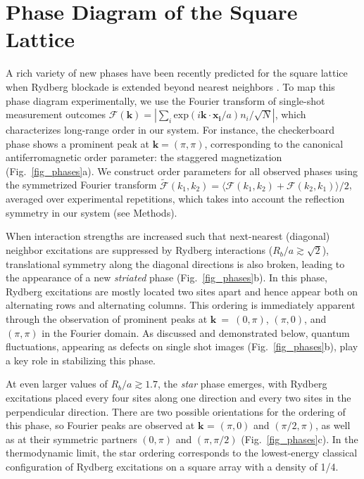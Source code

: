 \documentclass[reprint,twocolumn,secnumarabic,amssymb, aps, prl]{revtex4-1}
\begin{document}
\section{Phase Diagram of the Square Lattice}

A rich variety of new phases have been recently predicted for the square lattice when Rydberg blockade is extended beyond nearest neighbors \cite{Rhine2020}. To map this phase diagram experimentally, we use the Fourier transform of single-shot measurement outcomes $\mathcal{F}(\mathbf{k}) =  \left|\sum_{i} \text{exp} (i \mathbf{k \cdot x_i}/a) n_i / \sqrt{N}\right|$, which characterizes long-range order in our system. For instance, the checkerboard phase shows a prominent peak at $\mathbf{k}=(\pi,\pi)$, corresponding to the canonical antiferromagnetic order parameter: the staggered magnetization (Fig.~\ref{fig_phases}a). We construct order parameters for all observed phases using the symmetrized Fourier transform $ \tilde{\mathcal{F}} (k_1,k_2) = \langle \mathcal{F}(k_1,k_2) + \mathcal{F}(k_2,k_1) \rangle/2$, averaged over experimental repetitions, which takes into account the reflection symmetry in our system (see Methods).

When interaction strengths are increased such that next-nearest (diagonal) neighbor excitations are suppressed by Rydberg interactions ($R_b/a \gtrsim \sqrt{2}$), translational symmetry along the diagonal directions is also broken, leading to the appearance of a new \textit{striated} phase (Fig.~\ref{fig_phases}b). In this phase, Rydberg excitations are mostly located two sites apart and hence appear both on alternating rows and alternating columns. This ordering is immediately apparent through the observation of prominent peaks at $\mathbf{k}~=~(0,\pi)$, $(\pi, 0)$, and $(\pi, \pi)$ in the Fourier domain. As discussed and demonstrated below, quantum fluctuations, appearing as defects on single shot images (Fig.~\ref{fig_phases}b), play a key role in stabilizing this phase. 

At even larger values of $R_b/a \gtrsim 1.7$, the \textit{star} phase emerges, with Rydberg excitations placed every four sites along one direction and every two sites in the perpendicular direction. There are two possible orientations for the ordering of this phase, so Fourier peaks are observed at $\mathbf{k}$ = $(\pi, 0)$ and $(\pi/2, \pi)$, as well as at their symmetric partners $(0, \pi)$ and $(\pi, \pi/2)$ (Fig.~\ref{fig_phases}c). In the thermodynamic limit, the star ordering corresponds to the lowest-energy classical configuration of Rydberg excitations on a square array with a density of 1/4.
\end{document}
